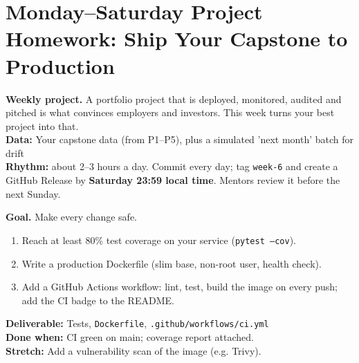 \clearpage
\section*{Monday--Saturday Project Homework: Ship Your Capstone to Production}
\begin{tcolorbox}[enhanced,colback=navy,colframe=gold,boxrule=0.8pt,arc=3pt,coltext=white,left=8pt,right=8pt,top=6pt,bottom=6pt]
{\color{gold}\bfseries Weekly project.} A portfolio project that is deployed, monitored, audited and pitched is what convinces employers and investors. This week turns your best project into that.\\[3pt]
{\color{gold}\bfseries Data:} Your capstone data (from P1--P5), plus a simulated 'next month' batch for drift\\[3pt]
{\color{gold}\bfseries Rhythm:} about 2--3 hours a day. Commit every day; tag \texttt{week-6} and create a GitHub Release by \textbf{Saturday 23:59 local time}. Mentors review it before the next Sunday.
\end{tcolorbox}

\begin{tcolorbox}[enhanced,breakable,colback=white,colframe=sun,boxrule=0.8pt,arc=2pt,left=7pt,right=7pt,top=4pt,bottom=4pt,
  title={\bfseries Monday --- Tests, container and CI\hfill\normalfont\small 3 h},coltitle=white,colbacktitle=sun,fonttitle=\small]
\textbf{Goal.} Make every change safe.
\begin{enumerate}[itemsep=1pt,topsep=2pt]
  \item Reach at least 80\% test coverage on your service (\texttt{pytest --cov}).
  \item Write a production Dockerfile (slim base, non-root user, health check).
  \item Add a GitHub Actions workflow: lint, test, build the image on every push; add the CI badge to the README.
\end{enumerate}
\textbf{\color{dataC}Deliverable:} Tests, \texttt{Dockerfile}, \texttt{.github/workflows/ci.yml}\\
\textbf{\color{navy}Done when:} CI green on main; coverage report attached.\\
\textbf{\color{skillC}Stretch:} Add a vulnerability scan of the image (e.g. Trivy).
\end{tcolorbox}

